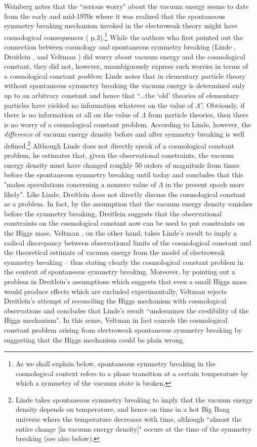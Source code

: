 \documentclass[12pt]{article}
\begin{document}
Weinberg notes that the ``serious worry" about the vacuum energy
seems to date from the early and mid-1970s where it was realized
that the spontaneous symmetry breaking mechanism invoked in the
electroweak theory might have cosmological consequences
(\cite{Weinberg89} p.3).\footnote{As we shall explain below,
spontaneous symmetry breaking in the cosmological context refers
to a phase transition at a certain temperature by which a symmetry
of the vacuum state is broken.} While the authors who first
pointed out the connection between cosmology and spontaneous
symmetry breaking (Linde \cite{linde74}, Dreitlein
\cite{dreitlein74}, and Veltman \cite{veltman75}) did worry about
vacuum energy and the cosmological constant, they did not,
however, unambiguously express such worries in terms of a
cosmological constant {\em problem}: Linde notes that in
elementary particle theory without spontaneous symmetry breaking
the vacuum energy is determined only up to an arbitrary constant
and hence that ``...the `old' theories of elementary particles
have yielded no information whatever on the value of $\Lambda$''.
Obviously, if there is no information at all on the value of
$\Lambda$ from particle theories, then there is no worry of a
cosmological constant problem. According to Linde, however, the
{\em difference} of vacuum energy density before and after
symmetry breaking is well defined.\footnote{Linde takes
spontaneous symmetry breaking to imply that the vacuum energy
density depends on temperature, and hence on time in a hot Big
Bang universe where the temperature decreases with time, although
``almost the entire change [in vacuum energy density]" occurs at
the time of the symmetry breaking (see also below).} Although
Linde does not directly speak of a cosmological constant problem,
he estimates that, given the observational constraints, the vacuum
energy density must have changed roughly 50 orders of magnitude
from times before the spontaneous symmetry breaking until today
and concludes that this "makes speculations concerning a nonzero
value of $\Lambda$ in the present epoch more likely". Like Linde,
Dreitlein \cite{dreitlein74} does not directly discuss the
cosmological constant as a problem. In fact, by the assumption
that the vacuum energy density vanishes before the symmetry
breaking, Dreitlein suggests that the observational constraints on
the cosmological constant now can be used to put constraints on
the Higgs mass. Veltman \cite{veltman75}, on the other hand, takes
Linde's result to imply a radical discrepancy between
observational limits of the cosmological constant and the
theoretical estimate of vacuum energy from the model of
electroweak symmetry breaking -- thus stating clearly the
cosmological constant problem in the context of spontaneous
symmetry breaking. Moreover, by pointing out a problem in
Dreitlein's assumptions which suggests that even a small Higgs
mass would produce effects which are excluded experimentally,
Veltman rejects Dreitlein's attempt of reconciling the Higgs
mechanism with cosmological observations and concludes that
Linde's result ``undermines the credibility of the Higgs
mechanism". In this sense, Veltman in fact cancels the
cosmological constant problem arising from electroweak spontaneous
symmetry breaking by suggesting that the Higgs mechanism could be
plain wrong.
\end{document}
